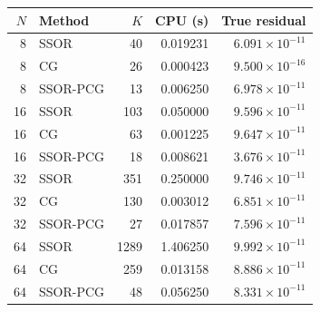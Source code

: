 \begin{tabular}{rlrrr}
\toprule
$N$ & Method & $K$ & CPU (s) & True residual \\
\midrule
8 & SSOR & 40 & 0.019231 & $6.091\times10^{-11}$ \\
8 & CG & 26 & 0.000423 & $9.500\times10^{-16}$ \\
8 & SSOR-PCG & 13 & 0.006250 & $6.978\times10^{-11}$ \\
16 & SSOR & 103 & 0.050000 & $9.596\times10^{-11}$ \\
16 & CG & 63 & 0.001225 & $9.647\times10^{-11}$ \\
16 & SSOR-PCG & 18 & 0.008621 & $3.676\times10^{-11}$ \\
32 & SSOR & 351 & 0.250000 & $9.746\times10^{-11}$ \\
32 & CG & 130 & 0.003012 & $6.851\times10^{-11}$ \\
32 & SSOR-PCG & 27 & 0.017857 & $7.596\times10^{-11}$ \\
64 & SSOR & 1289 & 1.406250 & $9.992\times10^{-11}$ \\
64 & CG & 259 & 0.013158 & $8.886\times10^{-11}$ \\
64 & SSOR-PCG & 48 & 0.056250 & $8.331\times10^{-11}$ \\
\bottomrule
\end{tabular}
